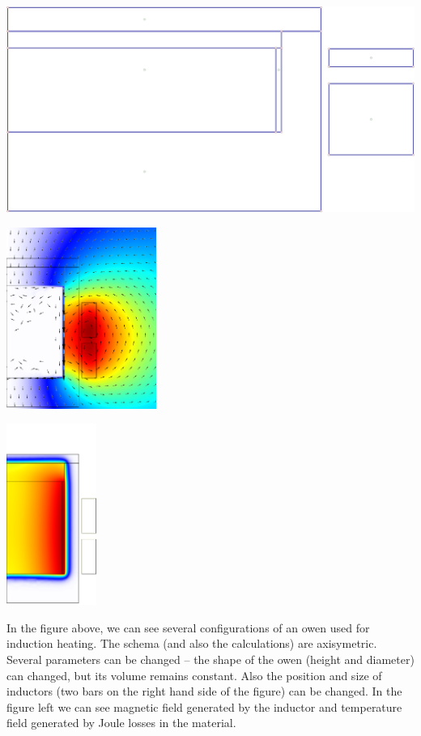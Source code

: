 \documentclass[portrait, a1paper, fontscale=0.5]{baposter}
\begin{document}
\begin{poster}
{\begin{center}
\begin{minipage}{8em}
	\end{minipage}
	\begin{minipage}{10em}
		\centering
		\includegraphics[scale=0.125]{optimization/variant_5.png}
	\end{minipage}
\end{center}

\begin{center}
	\begin{minipage}{12em}
		\centering
		\includegraphics[height=16em]{optimization/magnetic_field.png}
	\end{minipage}
	\begin{minipage}{12em}
		\centering
		\includegraphics[height=16em]{optimization/temperature_field.png}
	\end{minipage}
	\begin{minipage}{26em}
		In the figure above, we can see several configurations of an owen used for induction heating.
The schema (and also the calculations) are axisymetric.
Several parameters can be changed -- the shape of the owen (height and diameter) can changed, but its volume remains constant.
Also the position and size of inductors (two bars on the right hand side of the figure) can be changed. In the figure left we can 
see magnetic field generated by the inductor and temperature field generated by Joule losses in the material.


\end{minipage}
\end{center}}
\end{poster}
\end{document}

